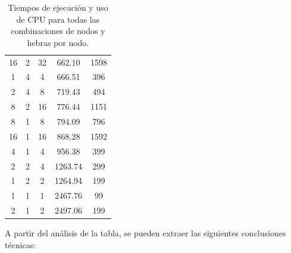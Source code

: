 \begin{table}[ht]
\begin{tabular}{c c c c c}
        16             & 2                      & 32                      & 662.10              & 1598                     \\
        1              & 4                      & 4                       & 666.51              & 396                      \\
        2              & 4                      & 8                       & 719.43              & 494                      \\
        8              & 2                      & 16                      & 776.44              & 1151                     \\
        8              & 1                      & 8                       & 794.09              & 796                      \\
        16             & 1                      & 16                      & 868.28              & 1592                     \\
        4              & 1                      & 4                       & 956.38              & 399                      \\
        2              & 2                      & 4                       & 1263.74             & 299                      \\
        1              & 2                      & 2                       & 1264.94             & 199                      \\
        1              & 1                      & 1                       & 2467.76             & 99                       \\
        2              & 1                      & 2                       & 2497.06             & 199                      \\
        \hline
    \end{tabular}
    \caption{Tiempos de ejecución y uso de CPU para todas las combinaciones de nodos y hebras por nodo.}
    \label{tab:exploratory_all_nodes_threads}
\end{table}

A partir del análisis de la tabla, se pueden extraer las siguientes conclusiones técnicas:

